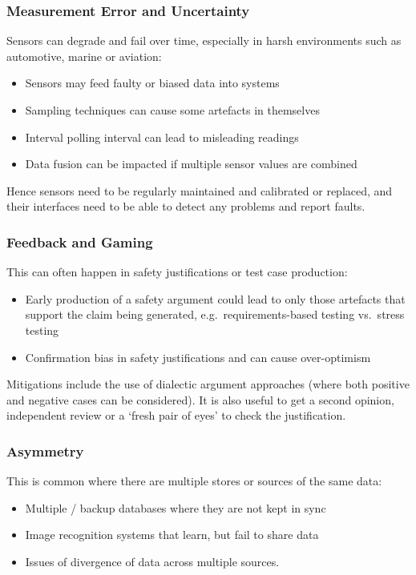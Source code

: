 \subsubsection{Measurement Error and Uncertainty}\label{bkm:dark10}
Sensors can degrade and fail over time, especially in harsh environments such as automotive, marine or aviation:
\begin{itemize}
\item Sensors may feed faulty or biased data into systems
  \item Sampling techniques can cause some artefacts in themselves
  \item Interval polling interval can lead to misleading readings
  \item Data fusion can be impacted if multiple sensor values are combined
\end{itemize}

Hence sensors need to be regularly maintained and calibrated or replaced, and their interfaces need to be able to detect any problems and report faults. 

\subsubsection{Feedback and Gaming}\label{bkm:dark11}
This can often happen in safety justifications or test case production:
\begin{itemize}
\item Early production of a safety argument could lead to only those artefacts that support the claim being generated, e.g.\ requirements-based testing vs.\ stress testing
  \item Confirmation bias in safety justifications and can cause over-optimism
\end{itemize}

Mitigations include the use of dialectic argument approaches (where both positive and negative cases can be considered). It is also useful to get a second opinion, independent review or a ‘fresh pair of eyes’ to check the justification.

\subsubsection{ Asymmetry}\label{bkm:dark12}
This is common where there are multiple stores or sources of the same data:
\begin{itemize}
\item Multiple / backup \glspl{database} where they are not kept in sync
  \item Image recognition systems that learn, but fail to share data
  \item Issues of divergence of data across multiple sources.
\end{itemize}

